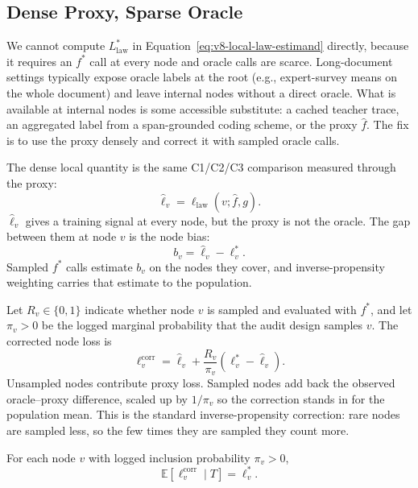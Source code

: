 \subsection{Dense Proxy, Sparse Oracle}

We cannot compute \(L_{\mathrm{law}}^\ast\) in
Equation~\eqref{eq:v8-local-law-estimand} directly, because it
requires an \(f^\ast\) call at every node and oracle calls are
scarce. Long-document settings typically expose oracle labels at
the root (e.g., expert-survey means on the whole document) and
leave internal nodes without a direct oracle. What is available at
internal nodes is some accessible substitute: a cached teacher
trace, an aggregated label from a span-grounded coding scheme, or
the proxy \(\widehat f\). The fix is to use the proxy densely and
correct it with sampled oracle calls.

The dense local quantity is the same C1/C2/C3 comparison measured
through the proxy:
\[
  \widehat\ell_v
  =
  \ell_{\mathrm{law}}(v;\widehat f,g).
\]
\(\widehat\ell_v\) gives a training signal at every node, but the
proxy is not the oracle. The gap between them at node \(v\) is the
node bias:
\[
  b_v=\widehat\ell_v-\ell_v^\ast .
\]
Sampled \(f^\ast\) calls estimate \(b_v\) on the nodes they cover, and
inverse-propensity weighting carries that estimate to the population.

Let \(R_v\in\{0,1\}\) indicate whether node \(v\) is sampled and
evaluated with \(f^\ast\), and let \(\pi_v>0\) be the logged marginal
probability that the audit design samples \(v\). The corrected node
loss is
\begin{equation}
\label{eq:v8-corrected-node-loss}
  \ell_v^{\mathrm{corr}}
  =
  \widehat\ell_v
  +
  \frac{R_v}{\pi_v}
  \left(\ell_v^\ast-\widehat\ell_v\right).
\end{equation}
Unsampled nodes contribute proxy loss. Sampled nodes add back the
observed oracle--proxy difference, scaled up by \(1/\pi_v\) so the
correction stands in for the population mean. This is the standard
inverse-propensity correction: rare nodes are sampled less, so the
few times they are sampled they count more.

\begin{proposition}\label{prop:v10-corrected-loss-unbiased}
For each node \(v\) with logged inclusion probability \(\pi_v>0\),
\[
  \mathbb E\!\left[\ell_v^{\mathrm{corr}}\mid T\right]
  =\ell_v^\ast .
\]
\end{proposition}

